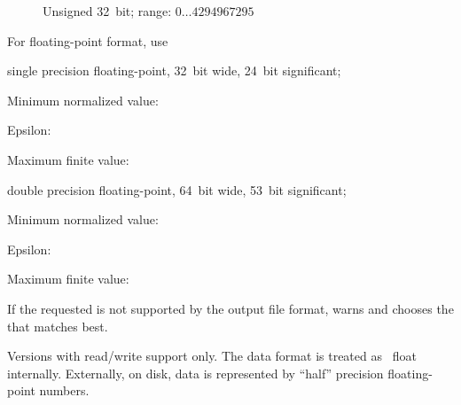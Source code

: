 \begin{codelist}
\begin{description}
  \item[]\itemend
    Unsigned 32~bit; range: $0\dots4294967295$
  \end{description}

  For floating-point format, use

  \begin{description}
  \item[\code{r32}]\itemend
     single precision floating-point, 32~bit wide, 24~bit significant;

    \begin{compactitemize}
    \item
      Minimum normalized value: 
    \item
      Epsilon: 
    \item
      Maximum finite value: 
    \end{compactitemize}

  \item[\code{r64}]\itemend
     double precision floating-point, 64~bit wide, 53~bit significant;

    \begin{compactitemize}
    \item
      Minimum normalized value: 
    \item
      Epsilon: 
    \item
      Maximum finite value: 
    \end{compactitemize}
  \end{description}

  If the requested  is not supported by the output file format, \App{} warns and
  chooses the  that matches best.

  \begin{restrictedmaterial}{Versions with  read\slash write support only.}
    \noindent The  data format is treated as ~float
    internally.  Externally, on disk,  data is represented by ``half''
    precision floating-point numbers.


\end{restrictedmaterial}
\end{codelist}
